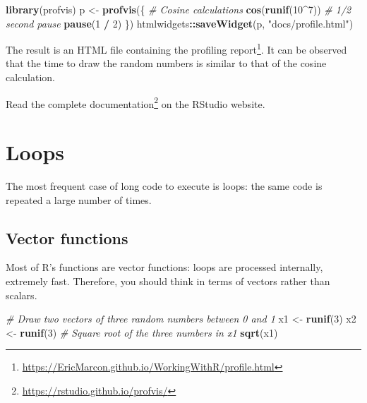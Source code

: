 \documentclass[
  12pt,
  american,
  a4paper,
  extrafontsizes,onecolumn,openright
  ]{memoir}
\newenvironment{Shaded}{\begin{snugshade}}{\end{snugshade}}
\newcommand{\CommentTok}[1]{\textcolor[rgb]{0.56,0.35,0.01}{\textit{#1}}}
\newcommand{\DecValTok}[1]{\textcolor[rgb]{0.00,0.00,0.81}{#1}}
\newcommand{\FunctionTok}[1]{\textcolor[rgb]{0.13,0.29,0.53}{\textbf{#1}}}
\newcommand{\NormalTok}[1]{#1}
\newcommand{\OtherTok}[1]{\textcolor[rgb]{0.56,0.35,0.01}{#1}}
\newcommand{\SpecialCharTok}[1]{\textcolor[rgb]{0.81,0.36,0.00}{\textbf{#1}}}
\newcommand{\StringTok}[1]{\textcolor[rgb]{0.31,0.60,0.02}{#1}}
\begin{document}
\begin{Shaded}
\begin{Highlighting}[]
\FunctionTok{library}\NormalTok{(profvis)}
\NormalTok{p }\OtherTok{\textless{}{-}} \FunctionTok{profvis}\NormalTok{(\{}
  \CommentTok{\# Cosine calculations}
  \FunctionTok{cos}\NormalTok{(}\FunctionTok{runif}\NormalTok{(}\DecValTok{10}\SpecialCharTok{\^{}}\DecValTok{7}\NormalTok{))}
  \CommentTok{\# 1/2 second pause}
  \FunctionTok{pause}\NormalTok{(}\DecValTok{1} \SpecialCharTok{/} \DecValTok{2}\NormalTok{)}
\NormalTok{\})}
\NormalTok{htmlwidgets}\SpecialCharTok{::}\FunctionTok{saveWidget}\NormalTok{(p, }\StringTok{"docs/profile.html"}\NormalTok{)}
\end{Highlighting}
\end{Shaded}

\normalsize

The result is an HTML file containing the profiling report\footnote{\url{https://EricMarcon.github.io/WorkingWithR/profile.html}}.
It can be observed that the time to draw the random numbers is similar to that of the cosine calculation.

Read the complete documentation\footnote{\url{https://rstudio.github.io/profvis/}} on the RStudio website.

\section{Loops}\label{loops}

The most frequent case of long code to execute is loops: the same code is repeated a large number of times.

\subsection{Vector functions}\label{vector-functions}

Most of R's functions are vector functions: loops are processed internally, extremely fast.
Therefore, you should think in terms of vectors rather than scalars.

\scriptsize

\begin{Shaded}
\begin{Highlighting}[]
\CommentTok{\# Draw two vectors of three random numbers between 0 and 1}
\NormalTok{x1 }\OtherTok{\textless{}{-}} \FunctionTok{runif}\NormalTok{(}\DecValTok{3}\NormalTok{)}
\NormalTok{x2 }\OtherTok{\textless{}{-}} \FunctionTok{runif}\NormalTok{(}\DecValTok{3}\NormalTok{)}
\CommentTok{\# Square root of the three numbers in x1}
\FunctionTok{sqrt}\NormalTok{(x1)}
\end{Highlighting}
\end{Shaded}
\end{document}
